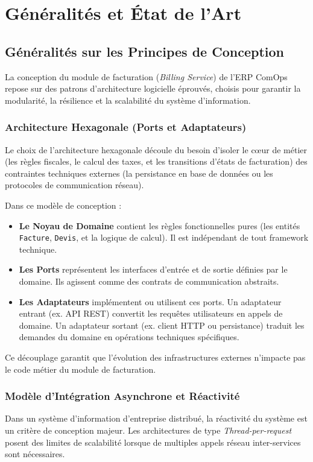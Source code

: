 \chapter{Généralités et État de l'Art}

\section{Généralités sur les Principes de Conception}

La conception du module de facturation (\textit{Billing Service}) de l'ERP ComOps repose sur des patrons d'architecture logicielle éprouvés, choisis pour garantir la modularité, la résilience et la scalabilité du système d'information.

\subsection{Architecture Hexagonale (Ports et Adaptateurs)}
Le choix de l'architecture hexagonale découle du besoin d'isoler le cœur de métier (les règles fiscales, le calcul des taxes, et les transitions d'états de facturation) des contraintes techniques externes (la persistance en base de données ou les protocoles de communication réseau). 

Dans ce modèle de conception :
\begin{itemize}
    \item \textbf{Le Noyau de Domaine} contient les règles fonctionnelles pures (les entités \texttt{Facture}, \texttt{Devis}, et la logique de calcul). Il est indépendant de tout framework technique.
    \item \textbf{Les Ports} représentent les interfaces d'entrée et de sortie définies par le domaine. Ils agissent comme des contrats de communication abstraits.
    \item \textbf{Les Adaptateurs} implémentent ou utilisent ces ports. Un adaptateur entrant (ex. API REST) convertit les requêtes utilisateurs en appels de domaine. Un adaptateur sortant (ex. client HTTP ou persistance) traduit les demandes du domaine en opérations techniques spécifiques.
\end{itemize}
Ce découplage garantit que l'évolution des infrastructures externes n'impacte pas le code métier du module de facturation.

\subsection{Modèle d'Intégration Asynchrone et Réactivité}
Dans un système d'information d'entreprise distribué, la réactivité du système est un critère de conception majeur. Les architectures de type \textit{Thread-per-request} posent des limites de scalabilité lorsque de multiples appels réseau inter-services sont nécessaires. 

